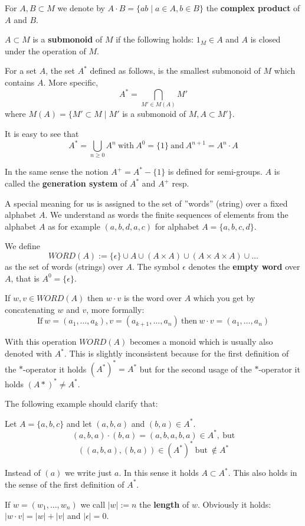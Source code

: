 For $A,B \subset M$ we denote by $A \cdot B = \{ a b \mid a \in A, b \in B \}$
the {\bf complex product} of $A$ and $B$.

$A \subset M$ is a {\bf submonoid} of $M$ if the following holds: $1_M \in A$
and $A$ is closed under the operation of $M$.

For a set $A$, the set $A^*$ defined as follows, is the smallest submonoid of
$M$ which contains $A$. More specific,
\[
		A^* = \bigcap_{M' \in M(A)} M'	
\]
where $M(A) = \{ M' \subset M \mid M'$ is a submonoid of $M, A \subset M' \}$.

It is easy to see that
\[
		A^* = \bigcup_{n \geq 0} A^n\ \mbox{with}\ A^0 = \{1\}\ \mbox{and}\ A^{n+1} =
		A^n \cdot A
\]

In the same sense the notion $A^+ = A^* - \{1\}$ is defined for semi-groups. $A$
is called the {\bf generation system} of $A^*$ and $A^+$ resp.

A special meaning for us is assigned to the set of ''words'' (string) over a
fixed alphabet $A$. We understand as words the finite sequences of elements from
the alphabet $A$ as for example $(a,b,d,a,c)$ for alphabet $A = \{ a,b,c,d \}$.

We define
\[
WORD(A) := \{\epsilon\} \cup A \cup (A \times A) \cup (A \times A \times A) \cup
\ldots
\]
as the set of words (strings) over $A$. The symbol $\epsilon$ denotes the {\bf
empty word} over $A$, that is $A^0 = \{\epsilon\}$.

If $w, v \in WORD(A)$ then $w \cdot v$ is the word over $A$ which you get by
concatenating $w$ and $v$, more formally:
\[
\mbox{If}\ w = (a_1,\ldots,a_k), v = (a_{k+1},\ldots,a_n)\ \mbox{then}\ w \cdot
v = (a_1, \ldots, a_n)
\]

With this operation $WORD(A)$ becomes a monoid which is usually also denoted
with $A^*$. This is slightly inconsistent because for the first definition of
the $*$-operator it holds $(A^*)^* = A^*$ but for the second usage of the
$*$-operator it holds $(A*)^* \neq A^*$.

The following example should clarify that: 

Let $A = \{a,b,c\}$ and let $(a,b,a)$ and $(b,a) \in A^*$.
\[(a,b,a)\cdot(b,a) = (a,b,a,b,a) \in A^*,\ \mbox{but}\]
\[((a,b,a),(b,a)) \in (A^*)^*\ \mbox{but}\ \notin A^*\]

Instead of $(a)$ we write just $a$. In this sense it holds $A \subset A^*$. This
also holds in the sense of the first definition of $A^*$.

If $w = (w_1, \ldots, w_n)$ we call $|w| := n$ the {\bf length} of
$w$. Obviously it holds: $|w \cdot v| = |w| + |v|$ and $|\epsilon| = 0$.

